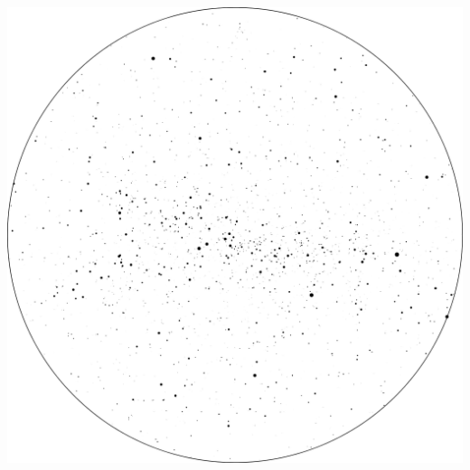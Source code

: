 \documentclass{./SAS-class-skygen}
\begin{document}
	\vspace{0.5cm}
    \begin{center}
    \includegraphics[width=\textwidth]{./pics/skychart4.png}
    \end{center}
    
    
\end{document}
